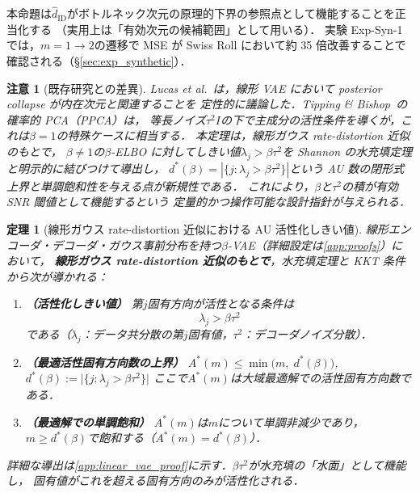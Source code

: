 \documentclass[11pt,a4paper]{jsarticle}
\newtheorem{theorem}{定理}
\newtheorem{remark}{注意}
\begin{document}
本命題は$\hat{d}_\mathrm{ID}$がボトルネック次元の原理的下界の参照点として機能することを正当化する
（実用上は「有効次元の候補範囲」として用いる）．
実験 Exp-Syn-1 では，$m = 1 \to 2$の遷移で MSE が Swiss Roll において約 35 倍改善することで確認される（§\ref{sec:exp_synthetic}）．

\begin{remark}[既存研究との差異]
Lucas et al.~\cite{lucas2019elbo}は，線形 VAE において posterior collapse が内在次元と関連することを
定性的に議論した．Tipping \& Bishop~\cite{tippingbishop1999ppca}の確率的 PCA（PPCA）は，
等長ノイズ$\tau^2 I$の下で主成分の活性条件を導くが，これは$\beta = 1$の特殊ケースに相当する．
本定理は，線形ガウス rate-distortion 近似のもとで，
$\beta \neq 1$の$\beta$-ELBO に対してしきい値$\lambda_j > \beta\tau^2$を
Shannon の水充填定理\cite{cover2006elements}と明示的に結びつけて導出し，
$d^*(\beta) = |\{j:\lambda_j > \beta\tau^2\}|$という AU 数の閉形式上界と単調飽和性を与える点が新規性である．
これにより，$\beta$と$\tau^2$の積が有効 SNR 閾値として機能するという
定量的かつ操作可能な設計指針が与えられる．
\end{remark}

\begin{theorem}[線形ガウス rate-distortion 近似における AU 活性化しきい値]\label{thm:linear_vae}
線形エンコーダ・デコーダ・ガウス事前分布を持つ$\beta$-VAE（詳細設定は\ref{app:proofs}）において，
\textbf{線形ガウス rate-distortion 近似のもとで}，水充填定理と KKT 条件から次が導かれる：

\begin{enumerate}
  \item \textbf{（活性化しきい値）} 第$j$固有方向が活性となる条件は
        \begin{equation}
          \lambda_j > \beta \tau^2 \label{eq:au_threshold}
        \end{equation}
        である（$\lambda_j$：データ共分散の第$j$固有値，$\tau^2$：デコーダノイズ分散）．
  \item \textbf{（最適活性固有方向数の上界）}
        $A^*(m) \leq \min\bigl(m,\; d^*(\beta)\bigr)$,\quad
        $d^*(\beta) := \bigl|\{j : \lambda_j > \beta\tau^2\}\bigr|$
        \newline
        ここで$A^*(m)$は大域最適解での活性固有方向数である．
  \item \textbf{（最適解での単調飽和）}
        $A^*(m)$は$m$について単調非減少であり，
        $m \geq d^*(\beta)$で飽和する（$A^*(m) = d^*(\beta)$）．
\end{enumerate}

\noindent
詳細な導出は\ref{app:linear_vae_proof}に示す．$\beta\tau^2$が水充填の「水面」として機能し，
固有値がこれを超える固有方向のみが活性化される．

\end{theorem}
\end{document}
